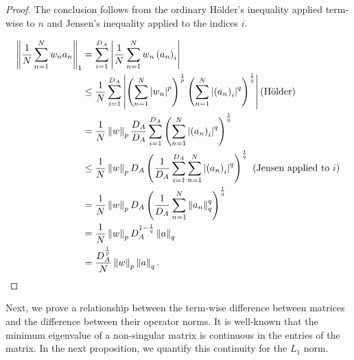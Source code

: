 \begin{proof}
The conclusion follows from the ordinary H{\"o}lder's inequality
applied term-wise to $n$ and Jensen's inequality applied to the indices
$i$.

\begin{align*}
\left\Vert \frac{1}{N}\sum_{n=1}^{N}w_{n}a_{n}\right\Vert_{1} & =\sum_{i=1}^{D_{A}}\left|\frac{1}{N}\sum_{n=1}^{N}w_{n}\left(a_{n}\right)_{i}\right|\\
 & \le\frac{1}{N}\sum_{i=1}^{D_{A}}\left|\left(\sum_{n=1}^{N}\left|w_{n}\right|^{p}\right)^{\frac{1}{p}}\left(\sum_{n=1}^{N}\left|\left(a_{n}\right)_{i}\right|^{q}\right)^{\frac{1}{q}}\right|\text{(H{\"o}lder)}\\
 & =\frac{1}{N}\left\Vert w\right\Vert_{p}\frac{D_{A}}{D_{A}}\sum_{i=1}^{D_{A}}\left(\sum_{n=1}^{N}\left|\left(a_{n}\right)_{i}\right|^{q}\right)^{\frac{1}{q}}\\
 & \le\frac{1}{N}\left\Vert w\right\Vert_{p}D_{A}\left(\frac{1}{D_{A}}\sum_{i=1}^{D_{A}}\sum_{n=1}^{N}\left|\left(a_{n}\right)_{i}\right|^{q}\right)^{\frac{1}{q}}\textrm{ (Jensen applied to }i\textrm{)}\\
 & =\frac{1}{N}\left\Vert w\right\Vert_{p}D_{A}\left(\frac{1}{D_{A}}\sum_{n=1}^{N}\left\Vert a_{n}\right\Vert_{q}^{q}\right)^{\frac{1}{q}}\\
 & =\frac{1}{N}\left\Vert w\right\Vert_{p}D_{A}^{1-\frac{1}{q}}\left\Vert a\right\Vert_{q}\\
 & =\frac{D_{A}^{\frac{1}{p}}}{N}\left\Vert w\right\Vert_{p}\left\Vert a\right\Vert_{q}.
\end{align*}
\end{proof}

%
Next, we prove a relationship between the term-wise difference between
matrices and the difference between their operator norms. It is well-known
that the minimum eigenvalue of a non-singular matrix is continuous
in the entries of the matrix. In the next proposition, we quantify
this continuity for the $L_{1}$ norm.


